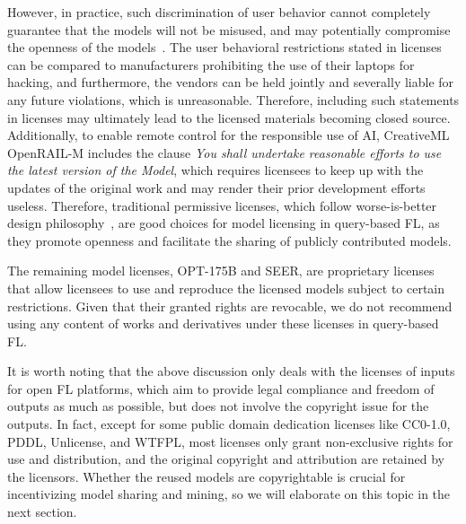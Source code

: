   However, in practice, such discrimination of user behavior cannot completely guarantee that the models will not be misused, and may potentially compromise the openness of the models~\cite{perens1999open, greenbaum2016the}.
  The user behavioral restrictions stated in licenses can be compared to manufacturers prohibiting the use of their laptops for hacking, and furthermore, the vendors can be held jointly and severally liable for any future violations, which is unreasonable.
  Therefore,  including such statements in licenses may ultimately lead to the licensed materials becoming closed source. 
  Additionally, to enable remote control for the responsible use of AI, CreativeML OpenRAIL-M includes the clause \textit{You shall undertake reasonable efforts to use the latest version of the Model}, which requires licensees to keep up with the updates of the original work and may render their prior development efforts useless.
  Therefore, traditional permissive licenses, which follow worse-is-better design philosophy~\cite{gabriel1991rise}, are good choices for model licensing in query-based FL, as they promote openness and facilitate the sharing of publicly contributed models.

  The remaining model licenses, OPT-175B and SEER, are proprietary licenses that allow licensees to use and reproduce the licensed models subject to certain restrictions. 
  Given that their granted rights are revocable, we do not recommend using any content of works and derivatives under these licenses in query-based FL.

It is worth noting that the above discussion only deals with the licenses of inputs for open FL platforms, which aim to provide legal compliance and freedom of outputs as much as possible, but does not involve the copyright issue for the outputs.
In fact, except for some public domain dedication licenses like CC0-1.0, PDDL, Unlicense, and WTFPL, most licenses only grant non-exclusive rights for use and distribution, and the original copyright and attribution are retained by the licensors.
Whether the reused models are copyrightable is crucial for incentivizing model sharing and mining, so we will elaborate on this topic in the next section.

